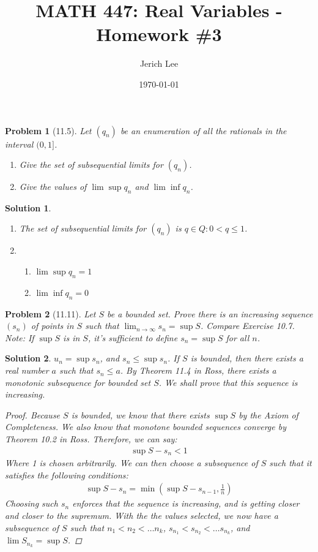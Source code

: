 \documentclass[12pt]{article}
\title{MATH 447: Real Variables - Homework \#3}
\author{Jerich Lee}
\date{\today}
\newtheorem{problem}{Problem}
\newtheorem{solution}{Solution}
\begin{document}
\maketitle

\begin{problem}[11.5]
Let $(q_n)$ be an enumeration of all the rationals in the interval $(0,1]$.
\begin{enumerate}
    \item Give the set of subsequential limits for $(q_n)$.
    \item Give the values of $\lim \sup q_n$ and $\lim \inf q_n$. 
\end{enumerate}
\end{problem}
\begin{solution}
    \begin{enumerate}      
  \item The set of subsequential limits for $(q_{n} )$ is ${q \in Q : 0 < q \leq 1}$. 
  \item  \begin{enumerate}
 \item $\lim \sup q_{n} =1$   
 \item $\lim \inf q_{n} = 0$ 
  \end{enumerate}    
   \end{enumerate}
\end{solution}

\begin{problem}[11.11]
    Let $S$ be a bounded set. Prove there is an increasing sequence $(s_n)$ of points in $S$ such that $\lim_{n \to \infty} s_n=\sup S$. Compare Exercise 10.7. Note: If $\sup S$ is in $S$, it's sufficient to define $s_n=\sup S$ for all $n$.  
\end{problem}

\begin{solution}
$u_{n} =\sup s_{n} $, and $s_{n} \leq \sup s_{n} $. If $S$ is bounded, then there exists a real number $a$ such that $s_{n} \leq a$. By Theorem 11.4 in Ross, there exists a monotonic subsequence for bounded set $S$. We shall prove that this sequence is increasing.
\begin{proof}
    Because $S$ is bounded, we know that there exists $\sup S$ by the Axiom of Completeness. We also know that monotone bounded sequences converge by Theorem 10.2 in Ross. Therefore, we can say:
    \begin{align}
        \sup S-s_{n} <1
    \end{align}
    Where 1 is chosen arbitrarily. We can then choose a subsequence of $S$ such that it satisfies the following conditions:
    \begin{align}
        \sup S - s_n = \min \left( \sup S - s_{n-1}, \frac{1}{n} \right)
    \end{align}
    Choosing such $s_{n} $ enforces that the sequence is increasing, and is getting closer and closer to the supremum. With the the values selected, we now have a subsequence of $S$ such that $n_1<n_{2}<\ldots n_k $, $s_{n_1}<s_{n_2}<\ldots s_{n_k}$, and $\lim S_{n_k} = \sup S$.  
\end{proof} 
\end{solution}
\end{document}
